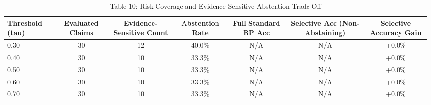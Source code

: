 \begin{table}[htbp]
\centering
\caption{Table 10: Risk-Coverage and Evidence-Sensitive Abstention Trade-Off}
\label{tab:table10_evidence_sensitive_analysis}
\begin{tabular}{lcccccc}
\hline
Threshold (tau) & Evaluated Claims & Evidence-Sensitive Count & Abstention Rate & Full Standard BP Acc & Selective Acc (Non-Abstaining) & Selective Accuracy Gain \\
\hline
0.30 & 30 & 12 & 40.0\% & N/A & N/A & +0.0\% \\
0.40 & 30 & 10 & 33.3\% & N/A & N/A & +0.0\% \\
0.50 & 30 & 10 & 33.3\% & N/A & N/A & +0.0\% \\
0.60 & 30 & 10 & 33.3\% & N/A & N/A & +0.0\% \\
0.70 & 30 & 10 & 33.3\% & N/A & N/A & +0.0\% \\
\hline
\end{tabular}
\end{table}